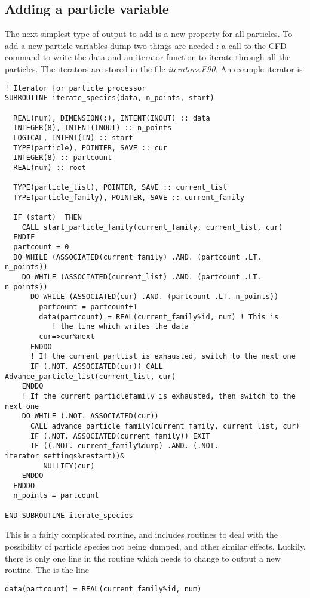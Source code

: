 \documentclass[12pt,a4paper]{article}
\newcommand{\simpleboxverbatim}{\begin{Verbatim}[obeytabs=true,frame=single,
  framerule=0.5mm,rulecolor=\color{warwickmid},formatcom=\color{black}]}
\begin{document}
\subsection{Adding a particle variable}
The next simplest type of output to add is a new property for all particles. To
add a new particle variables dump two things are needed : a call to the CFD
command to write the data and an iterator function to iterate through all the
particles. The iterators are stored in the file {\it iterators.F90}. An example
iterator is

\simpleboxverbatim
! Iterator for particle processor
SUBROUTINE iterate_species(data, n_points, start)

  REAL(num), DIMENSION(:), INTENT(INOUT) :: data
  INTEGER(8), INTENT(INOUT) :: n_points
  LOGICAL, INTENT(IN) :: start
  TYPE(particle), POINTER, SAVE :: cur
  INTEGER(8) :: partcount
  REAL(num) :: root

  TYPE(particle_list), POINTER, SAVE :: current_list
  TYPE(particle_family), POINTER, SAVE :: current_family

  IF (start)  THEN
    CALL start_particle_family(current_family, current_list, cur)
  ENDIF
  partcount = 0
  DO WHILE (ASSOCIATED(current_family) .AND. (partcount .LT. n_points))
    DO WHILE (ASSOCIATED(current_list) .AND. (partcount .LT. n_points))
      DO WHILE (ASSOCIATED(cur) .AND. (partcount .LT. n_points))
        partcount = partcount+1
        data(partcount) = REAL(current_family%id, num) ! This is
           ! the line which writes the data
        cur=>cur%next
      ENDDO
      ! If the current partlist is exhausted, switch to the next one
      IF (.NOT. ASSOCIATED(cur)) CALL Advance_particle_list(current_list, cur)
    ENDDO
    ! If the current particlefamily is exhausted, then switch to the next one
    DO WHILE (.NOT. ASSOCIATED(cur))
      CALL advance_particle_family(current_family, current_list, cur)
      IF (.NOT. ASSOCIATED(current_family)) EXIT
      IF ((.NOT. current_family%dump) .AND. (.NOT. iterator_settings%restart))&
         NULLIFY(cur)
    ENDDO
  ENDDO
  n_points = partcount

END SUBROUTINE iterate_species
\end{Verbatim}

This is a fairly complicated routine, and includes routines to deal with the
possibility of particle species not being dumped, and other similar
effects. Luckily, there is only one line in the routine which needs to change
to output a new routine. The is the line
\simpleboxverbatim
  data(partcount) = REAL(current_family%
\end{Verbatim}
\end{document}
